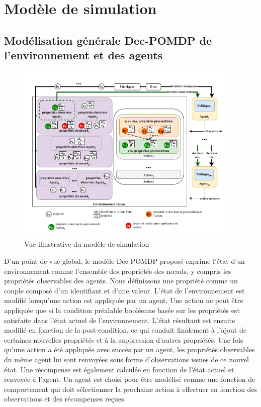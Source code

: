 \section{Modèle de simulation}

\subsection{Modélisation générale Dec-POMDP de l'environnement et des agents}


\begin{figure}[]
    \centering
    \includegraphics[width=0.97\textwidth]{figures/model_example_illustration.pdf}
    \caption{Vue illustrative du modèle de simulation}
    \label{fig:model_example_illustration}
\end{figure}

\noindent
D'un point de vue global, le modèle Dec-POMDP proposé exprime l'état d'un environnement comme l'ensemble des propriétés des nœuds, y compris les propriétés observables des agents. Nous définissons une propriété comme un couple composé d'un identifiant et d'une valeur. L'état de l'environnement est modifié lorsqu'une action est appliquée par un agent. Une action ne peut être appliquée que si la condition préalable booléenne basée sur les propriétés est satisfaite dans l'état actuel de l'environnement. L'état résultant est ensuite modifié en fonction de la post-condition, ce qui conduit finalement à l'ajout de certaines nouvelles propriétés et à la suppression d'autres propriétés. Une fois qu'une action a été appliquée avec succès par un agent, les propriétés observables du même agent lui sont renvoyées sous forme d'observations issues de ce nouvel état. Une récompense est également calculée en fonction de l'état actuel et renvoyée à l'agent. Un agent est choisi pour être modélisé comme une fonction de comportement qui doit sélectionner la prochaine action à effectuer en fonction des observations et des récompenses reçues.


